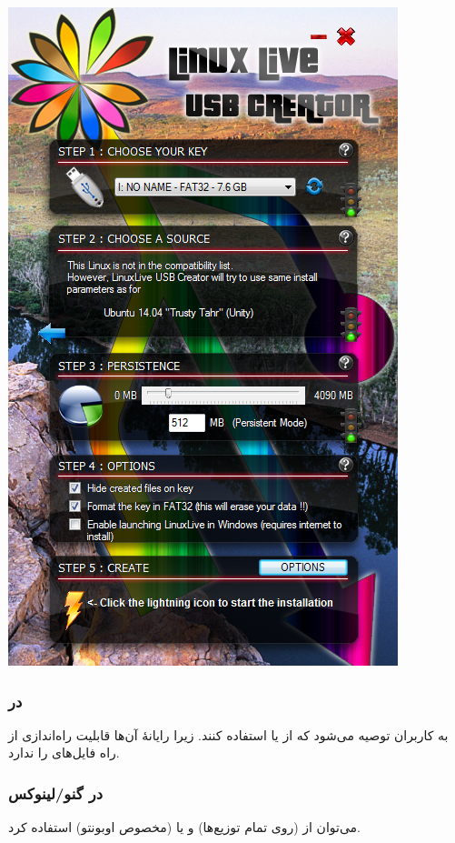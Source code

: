 \begin{center}
\includegraphics[scale=0.6]{pics/1.png}\\
\end{center}

\subsubsection{در }
به کاربران  توصیه می‌شود که از  یا  استفاده کنند. زیرا 
رایانهٔ  آن‌ها قابلیت راه‌اندازی از راه فایل‌های  را ندارد.

\subsubsection{در گنو/لینوکس}
می‌توان از  (روی تمام توزیع‌ها) و یا  (مخصوص اوبونتو) استفاده کرد.

